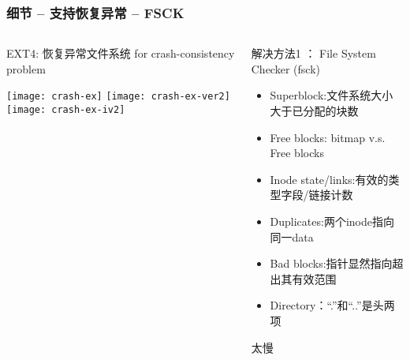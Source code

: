 \begin{frame}[fragile]
	\frametitle{细节 -- 支持恢复异常 -- FSCK}
	\begin{columns}
		\begin{column}{.4\textwidth}
			EXT4: 恢复异常文件系统 for crash-consistency problem
			
			\centering
			\texttt{[image: crash-ex]}
			\texttt{[image: crash-ex-ver2]}
			\texttt{[image: crash-ex-iv2]}	
		\end{column}
		\begin{column}{.6\textwidth}			
			解决方法1 ： File System Checker (fsck)
			\begin{itemize}
				\item Superblock:文件系统大小大于已分配的块数 \pause
				\item Free blocks: bitmap v.s. Free blocks \pause
				\item Inode state/links:有效的类型字段/链接计数 \pause
				\item Duplicates:两个inode指向同一data  \pause
				\item Bad blocks:指针显然指向超出其有效范围 \pause
				\item Directory：“.”和“..”是头两项
			\end{itemize}
			\pause
			\Large 太慢
		\end{column}
	\end{columns}
	
\end{frame}

